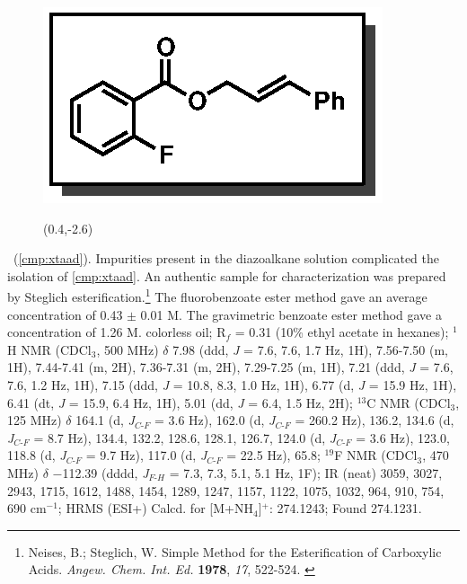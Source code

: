 \pagebreak
\begin{figure}
  \vspace{-15pt}
  \begin{center}
    \includegraphics[scale=0.8]{chp_asymmetric/images/xtaad}
          \begin{textblock}{1}(0.4,-2.6)  \end{textblock}
  \end{center}
  \vspace{-35pt}
\end{figure}\noindent \textbf{\CMPxtaad}\ (\ref{cmp:xtaad}). Impurities present in the diazoalkane solution complicated the
isolation of \ref{cmp:xtaad}. An authentic sample for characterization was
prepared by Steglich esterification.\footnote{{\frenchspacing Neises, B.; Steglich, W. Simple Method
for the Esterification of Carboxylic Acids. \textit{Angew. Chem. Int. Ed.} \textbf{1978},
\textit{17}, 522-524.} \label{ref:steglich}} The fluorobenzoate ester method gave an average concentration of 0.43 $\pm$ 0.01 M. The gravimetric benzoate ester method gave a
concentration of 1.26 M. colorless oil; R$_f$ = 0.31 (10\% ethyl acetate in
hexanes); $^1$H NMR (CDCl$_3$, 500 MHz) $\delta$ 7.98 (ddd, \textit{J} = 7.6, 7.6, 1.7 Hz, 1H), 7.56-7.50 (m, 1H), 7.44-7.41 (m, 2H), 7.36-7.31 (m, 2H),
7.29-7.25 (m, 1H), 7.21 (ddd, \textit{J} = 7.6, 7.6, 1.2 Hz, 1H), 7.15 (ddd,
\textit{J} = 10.8, 8.3, 1.0 Hz, 1H), 6.77 (d, \textit{J} = 15.9 Hz, 1H), 6.41
(dt, \textit{J} = 15.9, 6.4 Hz, 1H), 5.01 (dd, \textit{J} = 6.4, 1.5 Hz, 2H);
$^{13}$C NMR (CDCl$_3$, 125 MHz) $\delta$ 164.1 (d, \textit{J}$_{C\mbox{-}F}$ =
3.6 Hz), 162.0 (d, \textit{J}$_{C\mbox{-}F}$ = 260.2 Hz), 136.2, 134.6 (d,
\textit{J}$_{C\mbox{-}F}$ = 8.7 Hz), 134.4, 132.2, 128.6, 128.1, 126.7, 124.0
(d, \textit{J}$_{C\mbox{-}F}$ = 3.6 Hz), 123.0, 118.8 (d,
\textit{J}$_{C\mbox{-}F}$ = 9.7 Hz), 117.0 (d, \textit{J}$_{C\mbox{-}F}$ = 22.5
Hz), 65.8; $^{19}$F NMR (CDCl$_3$, 470 MHz) $\delta$ $-$112.39 (dddd,
\textit{J}$_{F\mbox{-}H}$ = 7.3, 7.3, 5.1, 5.1 Hz, 1F); IR (neat) 3059, 3027,
2943, 1715, 1612, 1488, 1454, 1289, 1247, 1157, 1122, 1075, 1032, 964, 910, 754,
690 cm$^{-1}$; HRMS (ESI+) Calcd. for  [M+NH$_4$]$^+$: 274.1243;
Found 274.1231.

